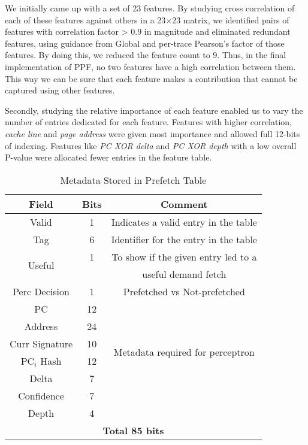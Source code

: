 We initially came up {with} a set of 23 features.  By studying cross
correlation of each of these features against others in a 23$\times$23
matrix, we identified pairs of features with correlation factor > 0.9
in magnitude and eliminated redundant features, using guidance from
Global and per-trace Pearson's factor of those features.  By doing
this, we reduced the feature count to 9.  Thus, in the final
implementation of PPF, no two features have a high correlation between
them. This way we can be sure that each feature makes a contribution
that cannot be captured using other features.

Secondly, studying the relative importance of each feature enabled us
to vary the number of entries dedicated for each feature. Features
with higher correlation, \textit{cache line} and \textit{page address}
were given most importance and allowed full 12-bits of indexing.
Features like \textit{PC XOR delta} and \textit{PC XOR depth} with a
low overall P-value were allocated fewer entries in the feature table.

\begin{table}[ht]
    \centering
    \begin{adjustbox}{width=0.9\columnwidth}
    \begin{tabular}{|c|c|c|}
    \hline
        \textbf{Field} &
        \textbf{Bits} &
        \textbf{Comment} \\
    \hline
         Valid 		& 1  & Indicates a valid entry in the table\\
         Tag 		& 6  & Identifier for the entry in the table\\
         \multirow{2}{1cm}{Useful} 	& 1  & To show if the given entry led to a\\
                    	&    & useful demand fetch\\
         Perc Decision 	& 1  & Prefetched vs Not-prefetched \\
    \hline
        PC 		& 12 & \\
        Address 	& 24 & \\
        Curr Signature 	& 10 & \multirow{2}{4.8cm}{Metadata required for perceptron}\\
	PC$_i$ Hash	& 12 & \multirow{2}{1.1cm}{training}\\
        Delta 		& 7  & \\
        Confidence 	& 7  & \\
	Depth		& 4  & \\
    \hline
        \multicolumn{3}{|c|}{\textbf{Total 85 bits}}\\
    \hline
    \end{tabular}
    \end{adjustbox}
    \caption{Metadata Stored in Prefetch Table}
    \label{tab:PTable_metadata}
\end{table}

